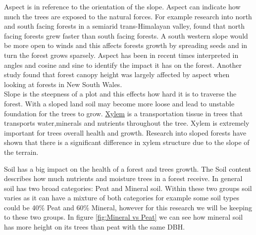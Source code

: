 \documentclass[a4paper,11pt,twoside]{report}
\begin{document}
\newpage
Aspect is in reference to the orientation of the slope. Aspect can indicate how much the trees are exposed to the natural forces. For example research into north and south facing forests in a semiarid trans-Himalayan valley, found that north facing forests grew faster than south facing forests. \cite{maaren2015facing}
A south western slope would be more open to winds and this affects forests growth by spreading seeds and in turn the forest grows sparsely. Aspect has been in recent times interpreted in angles and cosine and sine to identify the impact it has on the forest. Another study found that forest canopy height was largely affected by aspect when looking at forests in New South Wales.\cite{hu2018evaluating}\\ %
Slope is the steepness of a plot and this effects how hard it is to traverse the forest. With a sloped land soil may become more loose and lead to unstable foundation for the trees to grow. \href{https://pdfs.semanticscholar.org/6e74/b49c6c3f6c37ed93575f7f9e48878d30b391.pdf}{Xylem} is a transportation tissue in trees that transports water,minerals and nutrients throughout the tree. Xylem is extremely important for trees overall health and growth. Research into sloped forests have shown that there is a significant difference in xylem structure due to the slope of the terrain.\cite{barij2007does}



Soil has a big impact on the health of a forest and trees growth. The Soil content describes how much nutrients and moisture trees in a forest receive. In general soil has two broad categories: Peat and Mineral soil. Within these two groups soil varies as it can have a mixture of both categories for example some soil types could be 40\% Peat and 60\% Mineral, however for this research we will be keeping to these two groups. In figure \ref{fig:Mineral vs Peat} we can see how mineral soil has more height on its trees than peat with the same DBH.


\end{document}
